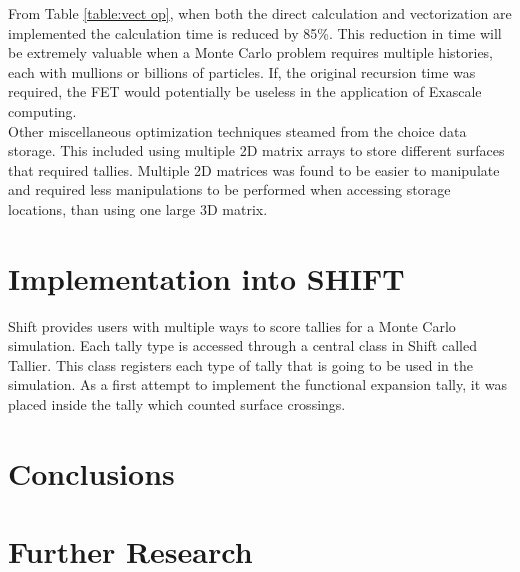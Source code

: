 \documentclass[10tma4paper]{article}
\begin{document}
From Table \ref{table:vect op}, when both the direct calculation and vectorization are implemented the calculation time is reduced by 85\%. This reduction in time will be extremely valuable when a Monte Carlo problem requires multiple histories, each with mullions or billions of particles. If, the original recursion time was required, the FET would potentially be useless in the application of Exascale computing.
\\
Other miscellaneous optimization techniques steamed from the choice data storage. This included using multiple 2D matrix arrays to store different surfaces that required tallies. Multiple 2D matrices was found to be easier to manipulate and required less manipulations to be performed when accessing storage locations, than using one large 3D matrix. 

\section{Implementation into SHIFT}\label{shift}
Shift provides users with multiple ways to score tallies for a Monte Carlo simulation. Each tally type is accessed through a central class in Shift called Tallier. This class registers each type of tally that is going to be used in the simulation. As a first attempt to implement the functional expansion tally, it was placed inside the tally which counted surface crossings. 

\section{Conclusions}\label{conclusion}

\section{Further Research}\label{further}
\end{document}

